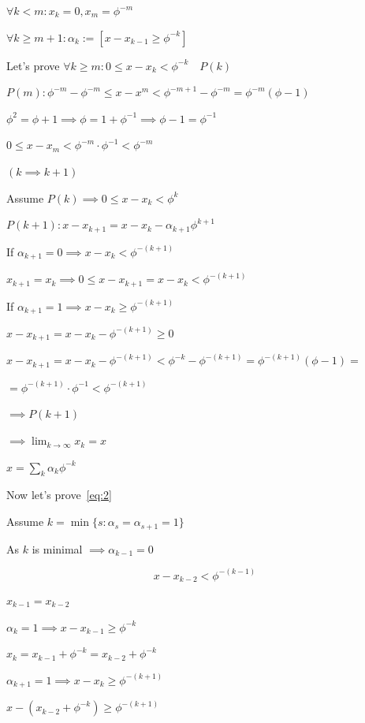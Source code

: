 \documentclass{article}
\begin{document}
\( \forall k<m: x_{k}=0, x_{m} = \phi^{-m} \)

\( \forall k \geq m + 1: \alpha_{k} := [x-x_{k-1} \geq \phi^{-k}] \)

Let's prove \( \forall k \geq m: 0 \leq x - x_{k} < \phi^{-k} \quad P(k) \)

\( P(m): \phi^{-m} - \phi^{-m} \leq x - x^{m} < \phi^{-m+1} - \phi^{-m} = \phi^{-m}(\phi - 1) \)

\( \phi^{2} = \phi + 1 \implies \phi = 1 + \phi^{-1} \implies \phi - 1 = \phi^{-1} \)

\( 0 \leq x - x_{m} < \phi^{-m}\cdot\phi^{-1} < \phi^{-m} \)

\( (k \implies k + 1) \)

Assume \( P(k) \implies 0 \leq x - x_{k} < \phi^{k} \)

\( P(k+1): x - x_{k+1} = x-x_{k} - \alpha_{k+1}\phi^{k+1} \)

If \( \alpha_{k+1} = 0 \implies x - x_{k} < \phi^{-(k+1)} \)

\( x_{k+1} = x_{k} \implies 0 \leq x - x_{k+1} = x - x_{k} < \phi^{-(k+1)} \)

If \( \alpha_{k+1} = 1 \implies x - x_{k} \geq \phi^{-(k+1)} \)

\( x - x_{k+1} = x - x_{k} - \phi^{-(k+1)} \geq 0 \)

\( x - x_{k+1} = x - x_{k} - \phi^{-(k+1)} < \phi^{-k} - \phi^{-(k+1)} = \phi^{-(k+1)} (\phi - 1) = \)

\( = \phi^{-(k+1)} \cdot \phi^{-1} < \phi^{-(k+1)} \)

\( \implies P(k+1) \)

\( \implies \lim_{k \to \infty} x_{k} = x \)

\( x = \sum_{k} \alpha_{k} \phi^{-k} \)

Now let's prove~\eqref{eq:2}

Assume \( k = \min \{ s: \alpha_{s} = \alpha_{s+1} = 1 \} \)

As \( k \) is minimal \( \implies \alpha_{k-1} = 0 \)

\[x - x_{k-2} < \phi^{-(k-1)} \tag{4}\label{eq:4}\]

\( x_{k-1} = x_{k-2} \)

\( \alpha_{k} = 1 \implies x - x_{k-1} \geq \phi^{-k} \)

\( x_{k} = x_{k-1} + \phi^{-k} = x_{k-2} + \phi^{-k} \)

\( \alpha_{k+1} = 1 \implies x - x_{k} \geq \phi^{-(k+1)} \)

\( x - (x_{k-2} + \phi^{-k}) \geq \phi^{-(k+1)} \)
\end{document}
